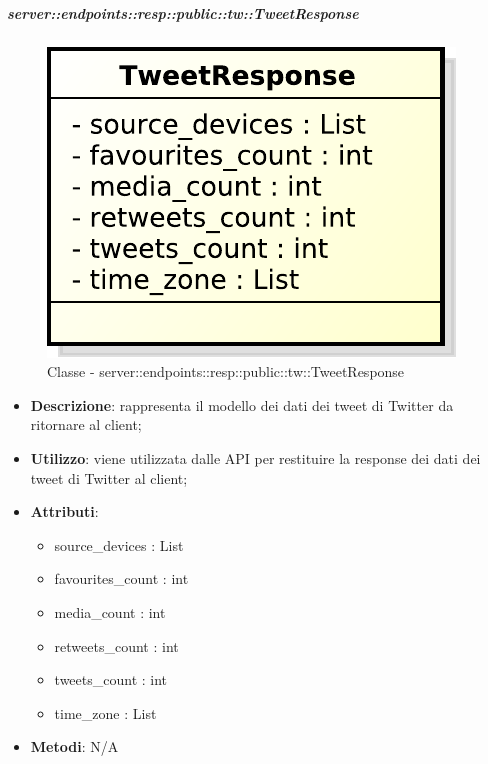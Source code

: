     \subparagraph{server::endpoints::resp::public::tw::TweetResponse} %
    \label{subp:bdsm_app_server_endpoints_resp_public_tw_tweetresponse}
	\begin{figure}[!htbp]
		\centering
		\centerline{\includegraphics[scale=0.6]{./images/server/classes/endpoints/tw/tweet_response.pdf}}
		\caption{Classe - server::endpoints::resp::public::tw::TweetResponse}
	\end{figure}
    \begin{itemize}
      \item \textbf{Descrizione}: rappresenta il modello dei dati dei tweet di Twitter da ritornare al client;
      \item \textbf{Utilizzo}: viene utilizzata dalle API per restituire la response dei dati dei tweet di Twitter al client;

	  \item \textbf{Attributi}:
	  	\begin{itemize}
	  		\item source\_devices : List
	  		\item favourites\_count : int
	  		\item media\_count : int
	  		\item retweets\_count : int
	  		\item tweets\_count : int
	  		\item time\_zone : List
	  	\end{itemize}
	  \item \textbf{Metodi}: N/A
    \end{itemize}

